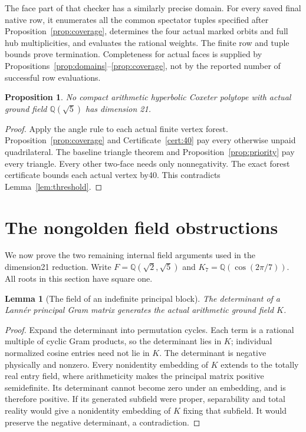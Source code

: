 \documentclass[11pt]{article}
\newtheorem{lemma}[theorem]{Lemma}
\newtheorem{proposition}[theorem]{Proposition}
\newcommand{\Q}{\mathbb Q}
\begin{document}
The face part of that checker has a similarly precise domain. For
every saved final native row, it enumerates all the common spectator
tuples specified after Proposition~\ref{prop:coverage}, determines
the four actual marked orbits and full hub multiplicities, and
evaluates the rational weights. The finite row and tuple bounds
prove termination. Completeness for actual faces is supplied by
Propositions~\ref{prop:domains}--\ref{prop:coverage}, not by the
reported number of successful row evaluations.

\begin{proposition}\label{prop:golden}
No compact arithmetic hyperbolic Coxeter polytope with actual ground field
$\Q(\sqrt5)$ has dimension 21.
\end{proposition}
\begin{proof}
Apply the angle rule to each actual finite vertex forest.
Proposition~\ref{prop:coverage} and Certificate~\ref{cert:40} pay every
otherwise unpaid quadrilateral. The baseline triangle theorem and
Proposition~\ref{prop:priority} pay every triangle. Every other two-face
needs only nonnegativity. The exact forest certificate bounds each
actual vertex by40. This contradicts Lemma~\ref{lem:threshold}.
\end{proof}

\section{The nongolden field obstructions}\label{sec:nongolden}
We now prove the two remaining internal field arguments used in the
dimension21 reduction. Write $F=\Q(\sqrt2,\sqrt5)$ and
$K_7=\Q(\cos(2\pi/7))$. All roots in this section have square one.

\begin{lemma}[The field of an indefinite principal block]\label{lem:detfield}
The determinant of a Lann\'er principal Gram matrix generates the
actual arithmetic ground field $K$.
\end{lemma}
\begin{proof}
Expand the determinant into permutation cycles. Each term is a rational
multiple of cyclic Gram products, so the determinant lies in $K$;
individual normalized cosine entries need not lie in $K$. The determinant
is negative physically and nonzero. Every nonidentity embedding of $K$
extends to the totally real entry field, where arithmeticity makes the
principal matrix positive semidefinite. Its determinant cannot become
zero under an embedding, and is therefore positive. If its generated
subfield were proper, separability and total reality would give a
nonidentity embedding of $K$ fixing that subfield. It would preserve the
negative determinant, a contradiction.
\end{proof}
\end{document}
